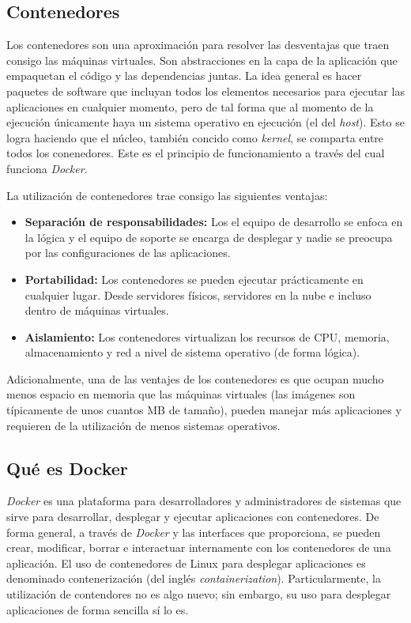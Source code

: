 \documentclass[12pt, letterpaper]{article}
\begin{document}
\subsection{Contenedores}
Los contenedores son una aproximación para resolver las desventajas que traen 
consigo las máquinas virtuales. Son abstracciones en la capa de la aplicación 
que empaquetan el código y las dependencias juntas. La idea general es hacer 
paquetes de software que incluyan todos los elementos necesarios para ejecutar 
las aplicaciones en cualquier momento, pero de tal forma que al momento de la 
ejecución únicamente haya un sistema operativo en ejecución (el del 
\textit{host}).  Esto se logra haciendo que el núcleo, también concido como 
\textit{kernel}, se comparta entre todos los conenedores. Este es el principio 
de funcionamiento a través del cual funciona \textit{Docker}.

La utilización de contenedores trae consigo las siguientes ventajas:
\begin{itemize}
  \item \textbf{Separación de responsabilidades:} Los el equipo de desarrollo 
  se enfoca en la lógica y el equipo de soporte se encarga de desplegar y 
  nadie se preocupa por las configuraciones de las aplicaciones.
  \item \textbf{Portabilidad:} Los contenedores se pueden ejecutar 
  prácticamente en cualquier lugar. Desde servidores físicos, servidores en la 
    nube e incluso dentro de  máquinas virtuales.
  \item \textbf{Aislamiento:} Los contenedores virtualizan los recursos de 
  CPU, memoria, almacenamiento y red a nivel de sistema operativo (de forma 
  lógica).
\end{itemize}

Adicionalmente, una de las ventajes de los contenedores es que ocupan mucho 
menos espacio en memoria que las máquinas virtuales (las imágenes son 
típicamente de unos cuantos MB de tamaño), pueden manejar más aplicaciones y 
requieren de la utilización de menos sistemas operativos.

\subsection{Qué es Docker}
\textit{Docker} es una plataforma para desarrolladores y administradores de 
sistemas que sirve para desarrollar, desplegar y ejecutar aplicaciones con 
contenedores. De forma general, a través de \textit{Docker} y las interfaces 
que proporciona, se pueden crear, modificar, borrar e interactuar internamente 
con los contenedores de una aplicación. El uso de contenedores de Linux para 
desplegar aplicaciones es denominado contenerización (del inglés 
\textit{containerization}).  Particularmente, la utilización de contendores no 
es algo nuevo; sin embargo, su uso para desplegar aplicaciones de forma 
sencilla sí lo es.
\end{document}
